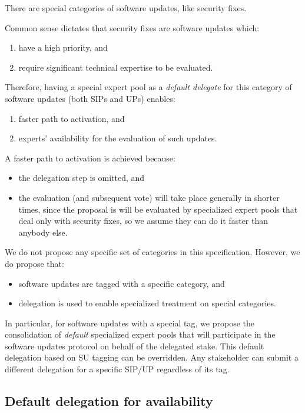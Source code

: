 \documentclass[11pt,a4paper]{article}
\begin{document}
There are special categories of software updates, like security fixes.

Common sense dictates that security fixes are software updates which:
\begin{enumerate}
\item have a high priority, and
\item require significant technical expertise to be evaluated.
\end{enumerate}
Therefore, having a special expert pool as a \emph{default delegate} for this
category of software updates (both SIPs and UPs) enables:
\begin{enumerate}
\item faster path to activation, and
\item experts' availability for the evaluation of such updates.
\end{enumerate}
A faster path to activation is achieved because:
\begin{itemize}
\item the delegation step is omitted, and
\item the evaluation (and subsequent vote) will take place generally in shorter
  times, since the proposal is will be evaluated by specialized expert pools that
  deal only with security fixes, so we assume they can do it faster than anybody
  else.
\end{itemize}

We do not propose any specific set of categories in this specification. However,
we do propose that:
\begin{itemize}
\item software updates are tagged with a specific category, and
\item delegation is used to enable specialized treatment on special categories.
\end{itemize}
In particular, for software updates with a special tag, we propose the
consolidation of \emph{default} specialized expert pools that will participate
in the software updates protocol on behalf of the delegated stake.
%
This default delegation based on SU tagging can be overridden. Any stakeholder
can submit a different delegation for a specific SIP/UP regardless of its tag.

\subsection{Default delegation for availability}
\label{sec:defa-deleg-avail}
\end{document}
